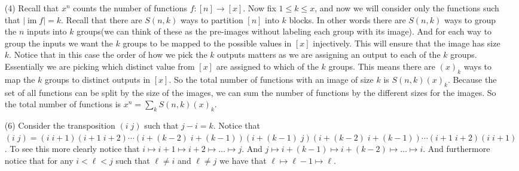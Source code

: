 \documentclass[12pt]{amsart}
\theoremstyle{definition}
\DeclareMathOperator{\image}{\mathrm{im}}
\newcommand{\ra}{\rightarrow}
\begin{document}
\begin{itemize}
\begin{itemize}
    \end{itemize}

\item[(4)] %
Recall that $x^n$ counts the number of functions $f:[n]\ra[x]$. Now fix $1\leq k\leq x$, and now we will consider only the functions such that $|\image{f}|=k$. Recall that there are $S(n,k)$ ways to partition $[n]$ into $k$ blocks. In other words there are $S(n,k)$ ways to group the $n$ inputs into $k$ groups(we can think of these as the pre-images without labeling each group with its image). And for each way to group the inputs we want the $k$ groups to be mapped to the possible values in $[x]$ injectively. This will ensure that the image has size $k$. Notice that in this case the order of how we pick the $k$ outputs matters as we are assigning an output to each of the $k$ groups. Essentially we are picking which distinct value from $[x]$ are assigned to which of the $k$ groups. This means there are $(x)_k$ ways to map the $k$ groups to distinct outputs in $[x]$. So the total number of functions with an image of size $k$ is $S(n,k)(x)_k$. Because the set of all functions can be split by the size of the images, we can sum the number of functions by the different sizes for the images. So the total number of functions is $x^n=\displaystyle{\sum_k S(n,k)(x)_k}$.\\


\item[(6)] %
Consider the transposition $(i\;j)$ such that $j-i=k$. Notice that $(i\;j)=(i\;i+1)(i+1\;i+2)\cdots (i+(k-2)\;i+(k-1))(i+(k-1)\;j)(i+(k-2)\;i+(k-1))\cdots(i+1\;i+2)(i\;i+1)$. 
To see this more clearly notice that $i\mapsto i+1\mapsto i+2\mapsto\dots\mapsto j$. And $j\mapsto i+(k-1)\mapsto i+(k-2)\mapsto\dots\mapsto i$. 
And furthermore notice that for any $i<\ell<j$ such that $\ell\neq i$ and $\ell\neq j$ we have that $\ell\mapsto \ell-1\mapsto\ell$.\\


\end{itemize}
\end{document}
